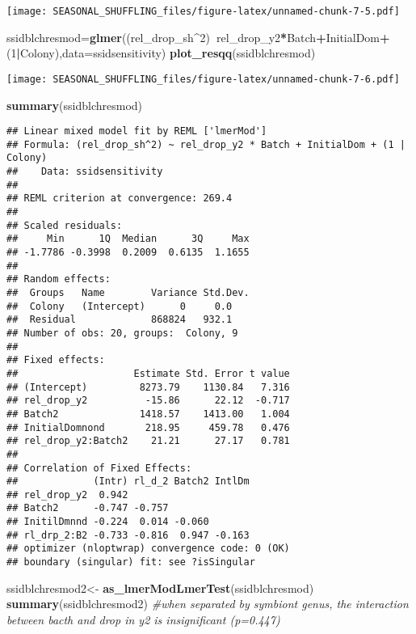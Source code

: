 \documentclass[]{article}
\newenvironment{Shaded}{\begin{snugshade}}{\end{snugshade}}
\newcommand{\CommentTok}[1]{\textcolor[rgb]{0.56,0.35,0.01}{\textit{#1}}}
\newcommand{\DataTypeTok}[1]{\textcolor[rgb]{0.13,0.29,0.53}{#1}}
\newcommand{\DecValTok}[1]{\textcolor[rgb]{0.00,0.00,0.81}{#1}}
\newcommand{\KeywordTok}[1]{\textcolor[rgb]{0.13,0.29,0.53}{\textbf{#1}}}
\newcommand{\NormalTok}[1]{#1}
\newcommand{\OperatorTok}[1]{\textcolor[rgb]{0.81,0.36,0.00}{\textbf{#1}}}
\newcommand{\StringTok}[1]{\textcolor[rgb]{0.31,0.60,0.02}{#1}}
\begin{document}
\texttt{[image: SEASONAL\_SHUFFLING\_files/figure-latex/unnamed-chunk-7-5.pdf]}

\begin{Shaded}
\begin{Highlighting}[]
\NormalTok{ssidblchresmod=}\KeywordTok{glmer}\NormalTok{((rel_drop_sh}\OperatorTok{^}\DecValTok{2}\NormalTok{)}\OperatorTok{~}\NormalTok{rel_drop_y2}\OperatorTok{*}\NormalTok{Batch}\OperatorTok{+}\NormalTok{InitialDom}\OperatorTok{+}\NormalTok{(}\DecValTok{1}\OperatorTok{|}\NormalTok{Colony),}\DataTypeTok{data=}\NormalTok{ssidsensitivity)}
\KeywordTok{plot_resqq}\NormalTok{(ssidblchresmod)}
\end{Highlighting}
\end{Shaded}

\texttt{[image: SEASONAL\_SHUFFLING\_files/figure-latex/unnamed-chunk-7-6.pdf]}

\begin{Shaded}
\begin{Highlighting}[]
\KeywordTok{summary}\NormalTok{(ssidblchresmod)}
\end{Highlighting}
\end{Shaded}

\begin{verbatim}
## Linear mixed model fit by REML ['lmerMod']
## Formula: (rel_drop_sh^2) ~ rel_drop_y2 * Batch + InitialDom + (1 | Colony)
##    Data: ssidsensitivity
## 
## REML criterion at convergence: 269.4
## 
## Scaled residuals: 
##     Min      1Q  Median      3Q     Max 
## -1.7786 -0.3998  0.2009  0.6135  1.1655 
## 
## Random effects:
##  Groups   Name        Variance Std.Dev.
##  Colony   (Intercept)      0     0.0   
##  Residual             868824   932.1   
## Number of obs: 20, groups:  Colony, 9
## 
## Fixed effects:
##                    Estimate Std. Error t value
## (Intercept)         8273.79    1130.84   7.316
## rel_drop_y2          -15.86      22.12  -0.717
## Batch2              1418.57    1413.00   1.004
## InitialDomnond       218.95     459.78   0.476
## rel_drop_y2:Batch2    21.21      27.17   0.781
## 
## Correlation of Fixed Effects:
##             (Intr) rl_d_2 Batch2 IntlDm
## rel_drop_y2  0.942                     
## Batch2      -0.747 -0.757              
## InitilDmnnd -0.224  0.014 -0.060       
## rl_drp_2:B2 -0.733 -0.816  0.947 -0.163
## optimizer (nloptwrap) convergence code: 0 (OK)
## boundary (singular) fit: see ?isSingular
\end{verbatim}

\begin{Shaded}
\begin{Highlighting}[]
\NormalTok{ssidblchresmod2<-}\StringTok{ }\KeywordTok{as_lmerModLmerTest}\NormalTok{(ssidblchresmod)}
\KeywordTok{summary}\NormalTok{(ssidblchresmod2) }\CommentTok{#when separated by symbiont genus, the interaction between bacth and drop in y2 is insignificant (p=0.447)}
\end{Highlighting}
\end{Shaded}
\end{document}
